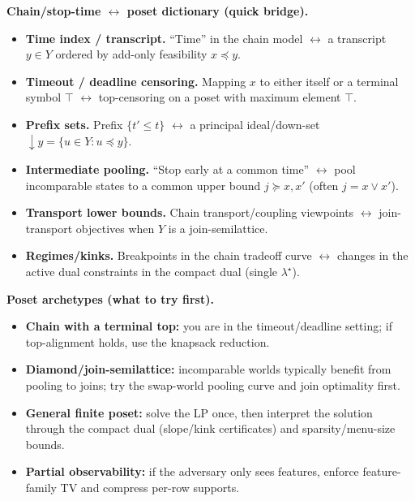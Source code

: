 \documentclass[11pt]{article}
\theoremstyle{definition}
\theoremstyle{remark}
\begin{document}
\vspace{0.25em}\noindent
\textbf{Chain/stop-time $\leftrightarrow$ poset dictionary (quick bridge).}
\begin{itemize}[leftmargin=*]
\item \textbf{Time index / transcript.} ``Time'' in the chain model $\longleftrightarrow$ a transcript $y\in Y$ ordered by add-only feasibility $x\preceq y$.
\item \textbf{Timeout / deadline censoring.} Mapping $x$ to either itself or a terminal symbol $\top$ $\longleftrightarrow$ top-censoring on a poset with maximum element $\top$.
\item \textbf{Prefix sets.} Prefix $\{t'\!\le t\}$ $\longleftrightarrow$ a principal ideal/down-set $\downarrow y=\{u\in Y: u\preceq y\}$.
\item \textbf{Intermediate pooling.} ``Stop early at a common time'' $\longleftrightarrow$ pool incomparable states to a common upper bound $j\succeq x,x'$ (often $j=x\vee x'$).
\item \textbf{Transport lower bounds.} Chain transport/coupling viewpoints $\longleftrightarrow$ join-transport objectives when $Y$ is a join-semilattice.
\item \textbf{Regimes/kinks.} Breakpoints in the chain tradeoff curve $\longleftrightarrow$ changes in the active dual constraints in the compact dual (single $\lambda^\star$).
\end{itemize}

\vspace{0.25em}\noindent
\textbf{Poset archetypes (what to try first).}
\begin{itemize}[leftmargin=*]
\item \textbf{Chain with a terminal top:} you are in the timeout/deadline setting; if top-alignment holds, use the knapsack reduction.
\item \textbf{Diamond/join-semilattice:} incomparable worlds typically benefit from pooling to joins; try the swap-world pooling curve and join optimality first.
\item \textbf{General finite poset:} solve the LP once, then interpret the solution through the compact dual (slope/kink certificates) and sparsity/menu-size bounds.
\item \textbf{Partial observability:} if the adversary only sees features, enforce feature-family TV and compress per-row supports.
\end{itemize}
\end{document}
